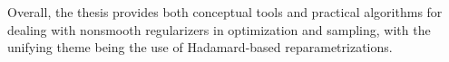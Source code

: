 \documentclass[11pt, twoside]{report}
\begin{document}
Overall, the thesis provides both conceptual tools and practical algorithms for dealing with
nonsmooth regularizers in optimization and sampling, with the unifying theme being the use of
Hadamard-based reparametrizations.

\end{document}
